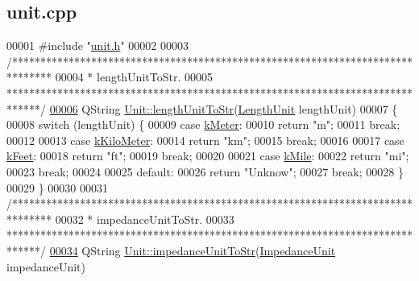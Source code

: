 \hypertarget{unit_8cpp_source}{}\subsection{unit.\+cpp}
\label{unit_8cpp_source}

\begin{DoxyCode}
00001 \textcolor{preprocessor}{#include "\hyperlink{unit_8h}{unit.h}"}
00002 
00003 \textcolor{comment}{/*******************************************************************************}
00004 \textcolor{comment}{ * lengthUnitToStr.}
00005 \textcolor{comment}{ ******************************************************************************/}
\hypertarget{unit_8cpp_source_l00006}{}\hyperlink{class_unit_abd363319f79f97b0a0b9a08c5ddc3cdb}{00006} QString \hyperlink{class_unit_abd363319f79f97b0a0b9a08c5ddc3cdb}{Unit::lengthUnitToStr}(\hyperlink{class_unit_a8c8921f7b225ad6063b1cb573425b9a0}{LengthUnit} lengthUnit)
00007 \{
00008   \textcolor{keywordflow}{switch} (lengthUnit) \{
00009   \textcolor{keywordflow}{case} \hyperlink{class_unit_a8c8921f7b225ad6063b1cb573425b9a0abfa41ebe7ee649a1f02c9b8ae570434b}{kMeter}:
00010     \textcolor{keywordflow}{return} \textcolor{stringliteral}{"m"};
00011     \textcolor{keywordflow}{break};
00012 
00013   \textcolor{keywordflow}{case} \hyperlink{class_unit_a8c8921f7b225ad6063b1cb573425b9a0a1c04f3dd196dbe1832a2658215b0d919}{kKiloMeter}:
00014     \textcolor{keywordflow}{return} \textcolor{stringliteral}{"km"};
00015     \textcolor{keywordflow}{break};
00016 
00017   \textcolor{keywordflow}{case} \hyperlink{class_unit_a8c8921f7b225ad6063b1cb573425b9a0a9ac9b167b0ebce477fb53d6ace04ddc8}{kFeet}:
00018     \textcolor{keywordflow}{return} \textcolor{stringliteral}{"ft"};
00019     \textcolor{keywordflow}{break};
00020 
00021   \textcolor{keywordflow}{case} \hyperlink{class_unit_a8c8921f7b225ad6063b1cb573425b9a0a2ebde742068bbee0510de32fbb4cd724}{kMile}:
00022     \textcolor{keywordflow}{return} \textcolor{stringliteral}{"mi"};
00023     \textcolor{keywordflow}{break};
00024 
00025   \textcolor{keywordflow}{default}:
00026     \textcolor{keywordflow}{return} \textcolor{stringliteral}{"Unknow"};
00027     \textcolor{keywordflow}{break};
00028   \}
00029 \}
00030 
00031 \textcolor{comment}{/*******************************************************************************}
00032 \textcolor{comment}{ * impedanceUnitToStr.}
00033 \textcolor{comment}{ ******************************************************************************/}
\hypertarget{unit_8cpp_source_l00034}{}\hyperlink{class_unit_ae3ca20f4b6530f04ca6aa138ec0fa7d2}{00034} QString \hyperlink{class_unit_ae3ca20f4b6530f04ca6aa138ec0fa7d2}{Unit::impedanceUnitToStr}(\hyperlink{class_unit_a3747e779c805df24a71961290be3fbdf}{ImpedanceUnit} impedanceUnit)

\end{DoxyCode}
